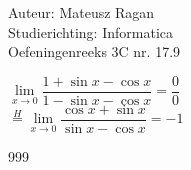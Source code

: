 \documentclass[a4paper]{article}
\begin{document}
\noindent \large Auteur: Mateusz Ragan \\
\noindent \large Studierichting: Informatica\\
\noindent \large Oefeningenreeks 3C nr. 17.9\\

\medskip

\normalsize

$\lim\limits_{x\rightarrow 0} \dfrac{1+\sin x -\cos x}{1- \sin x - \cos x} = \dfrac{0}{0}$\\

$\overset{H}{=} \lim\limits_{x\rightarrow 0} \dfrac{\cos x + \sin x}{\sin x - \cos x} = -1$

\begin{thebibliography}{999}
\end{thebibliography}
\end{document}
